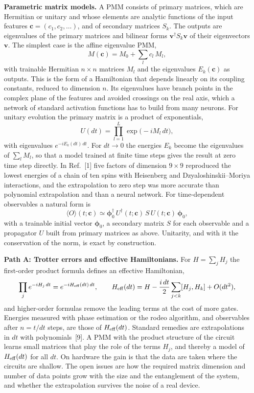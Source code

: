 \documentclass[12pt,a4paper]{article}
\begin{document}
\textbf{Parametric matrix models.}  A PMM consists of primary
matrices, which are Hermitian or unitary and whose elements are
analytic functions of the input features
$\boldsymbol c=(c_1,c_2,\dots)$, and of secondary matrices $S_k$.  The
outputs are eigenvalues of the primary matrices and bilinear forms
$\boldsymbol v^\dagger S_k\boldsymbol v$ of their eigenvectors
$\boldsymbol v$.  The simplest case is the affine eigenvalue PMM,
\[
  M(\boldsymbol c)=M_0+\sum_l c_l\,M_l ,
\]
with trainable Hermitian $n\times n$ matrices $M_l$ and the
eigenvalues $E_k(\boldsymbol c)$ as outputs.  This is the form of a
Hamiltonian that depends linearly on its coupling constants, reduced
to dimension $n$.  Its eigenvalues have branch points in the complex
plane of the features and avoided crossings on the real axis, which a
network of standard activation functions has to build from many
neurons.  For unitary evolution the primary matrix is a product of
exponentials,
\[
  U(dt)=\prod_{l=1}^{L}\exp\bigl(-iM_l\,dt\bigr),
\]
with eigenvalues $e^{-iE_k(dt)\,dt}$.  For $dt\to0$ the energies
$E_k$ become the eigenvalues of $\sum_lM_l$, so that a model trained
at finite time steps gives the result at zero time step directly.  In
Ref.~[1] five factors of dimension $9\times9$ reproduced the lowest
energies of a chain of ten spins with Heisenberg and
Dzyaloshinskii--Moriya interactions, and the extrapolation to zero
step was more accurate than polynomial extrapolation and than a neural
network.  For time-dependent observables a natural form is
\[
  \langle O\rangle(t;\boldsymbol c)\simeq
  \boldsymbol\phi_0^\dagger\,U^\dagger(t;\boldsymbol c)\,S\,
  U(t;\boldsymbol c)\,\boldsymbol\phi_0 ,
\]
with a trainable initial vector $\boldsymbol\phi_0$, a secondary
matrix $S$ for each observable and a propagator $U$ built from
primary matrices as above.  Unitarity, and with it the conservation
of the norm, is exact by construction.

\textbf{Path A: Trotter errors and effective Hamiltonians.}  For
$H=\sum_jH_j$ the first-order product formula defines an effective
Hamiltonian,
\[
  \prod_j e^{-iH_j\,dt}=e^{-iH_{\rm eff}(dt)\,dt},\qquad
  H_{\rm eff}(dt)=H-\frac{i\,dt}{2}\sum_{j<k}[H_j,H_k]+O(dt^2),
\]
and higher-order formulas remove the leading terms at the cost of more
gates.  Energies measured with phase estimation or the rodeo
algorithm, and observables after $n=t/dt$ steps, are those of
$H_{\rm eff}(dt)$.  Standard remedies are extrapolations in $dt$ with
polynomials~[9].  A PMM with the product structure of the circuit
learns small matrices that play the role of the terms $H_j$, and
thereby a model of $H_{\rm eff}(dt)$ for all $dt$.  On hardware the
gain is that the data are taken where the circuits are shallow.  The
open issues are how the required matrix dimension and number of data
points grow with the size and the entanglement of the system, and
whether the extrapolation survives the noise of a real device.
\end{document}
